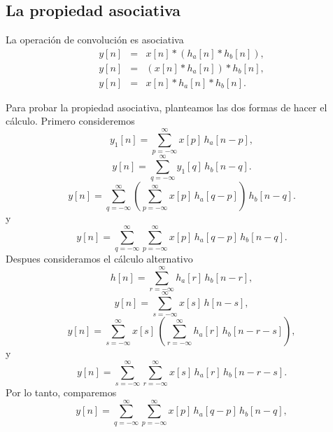 \subsection{La propiedad asociativa}

La operaci\'{o}n de convoluci\'{o}n es asociativa
\begin{eqnarray}
y\left[ n\right] &=&x\left[ n\right] * \left( h_a\left[ n\right] * h_{b} \left[ n\right] \right) , \\
y\left[ n\right] &=&\left( x\left[ n\right] *h_a\left[ n\right] \right) * h_{b}\left[ n\right] , \\
y\left[ n\right] &=&x\left[ n\right] *h_a\left[ n\right] *h_{b}\left[ n\right].
\end{eqnarray}

Para probar la propiedad asociativa, planteamos las dos formas de hacer el cálculo.
Primero consideremos
\begin{equation}
 y_{1}[n] = \sum_{p=-\infty}^{\infty} x[p] \, h_{a}[n-p],
\end{equation}
\begin{equation}
 y[n] = \sum_{q=-\infty}^{\infty} y_{1}[q] \, h_{b}[n-q].
\end{equation}
\begin{equation}
 y[n] = \sum_{q=-\infty}^{\infty} \left( \sum_{p=-\infty}^{\infty} x[p] \, h_{a}[q-p] \right) \, h_{b}[n-q].
\end{equation}
y
\begin{equation}
 y[n] = \sum_{q=-\infty}^{\infty} \sum_{p=-\infty}^{\infty} x[p] \, h_{a}[q-p]  \, h_{b}[n-q].
\end{equation}
Despues consideramos el cálculo alternativo
\begin{equation}
       h[n] = \sum_{r=-\infty}^{\infty} h_{a}[r] \, h_{b}[n-r],
\end{equation}
\begin{equation}
      y[n] = \sum_{s=-\infty}^{\infty} x[s] \, h[n-s],
\end{equation}
\begin{equation}
      y[n] = \sum_{s=-\infty}^{\infty} x[s] \, \left( \sum_{r=-\infty}^{\infty} h_{a}[r] \, h_{b}[n - r - s] \right),
\end{equation}
y
\begin{equation}
      y[n] = \sum_{s=-\infty}^{\infty} \sum_{r=-\infty}^{\infty} x[s] \, h_{a}[r] \, h_{b}[n -r -s].
\end{equation}
Por lo tanto, comparemos
\begin{equation}
 y[n] = \sum_{q=-\infty}^{\infty} \sum_{p=-\infty}^{\infty} x[p] \, h_{a}[q-p]  \, h_{b}[n-q],
\end{equation}
